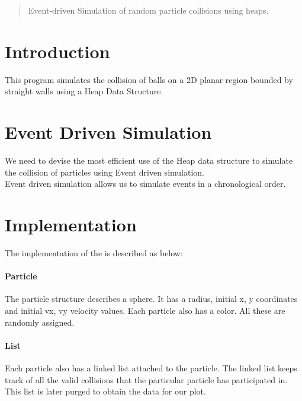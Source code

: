\documentclass[12pt]{article}
\begin{document}
\maketitle

\begin{abstract}
Event-driven Simulation of random particle collisions using heaps.
\end{abstract}

\section{Introduction}
This program simulates the collision of balls on a 2D planar region bounded by straight walls using a Heap Data Structure.\\

\section{Event Driven Simulation}
We need to devise the most efficient use of the Heap data structure to simulate the collision of particles using Event driven simulation. \\
Event driven simulation allows us to simulate events in a chronological order.\\

\section{Implementation}\label{Implementation}
The implementation of the is described as below:\\
\paragraph{Particle}
The particle structure describes a sphere. It has a radius, initial x, y coordinates and initial vx, vy velocity values. Each particle also has a color. All these are randomly assigned.\\

\paragraph{List}
Each particle also has a linked list attached to the particle. The linked list keeps track of all the valid collisions that the particular particle has participated in. This list is later purged to obtain the data for our plot.\\
\end{document}
